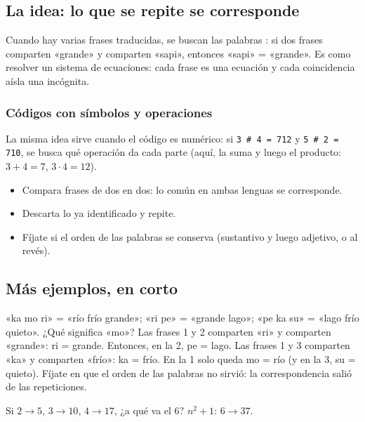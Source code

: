 \bitacora


\subsection{La idea: lo que se repite se corresponde}
Cuando hay varias frases traducidas, se buscan las palabras : si dos frases comparten «grande» y
comparten «sapi», entonces «sapi» = «grande». Es como resolver un sistema de ecuaciones: cada frase es una ecuación y
cada coincidencia aísla una incógnita.

\subsubsection{Códigos con símbolos y operaciones}
La misma idea sirve cuando el código es numérico: si \texttt{3 \# 4 = 712} y \texttt{5 \# 2 = 710}, se busca qué
operación da cada parte (aquí, la suma y luego el producto: $3 + 4 = 7$, $3 \cdot 4 = 12$).

\begin{regla}
\begin{itemize}
  \item Compara frases de dos en dos: lo común en ambas lenguas se corresponde.
  \item Descarta lo ya identificado y repite.
  \item Fíjate si el orden de las palabras se conserva (sustantivo y luego adjetivo, o al revés).
\end{itemize}
\end{regla}

\subsection{Más ejemplos, en corto}
\begin{ejemplo}
«ka mo ri» = «río frío grande»; «ri pe» = «grande lago»; «pe ka su» = «lago frío quieto». ¿Qué significa «mo»?
\solucion Las frases 1 y 2 comparten «ri» y comparten «grande»: ri = grande. Entonces, en la 2, pe = lago. Las frases 1 y
3 comparten «ka» y comparten «frío»: ka = frío. En la 1 solo queda mo = río (y en la 3, su = quieto). Fíjate en que el
orden de las palabras no sirvió: la correspondencia salió de las repeticiones.
\end{ejemplo}

\begin{ejemplo}
Si $2 \to 5$, $3 \to 10$, $4 \to 17$, ¿a qué va el 6?
\solucion $n^2 + 1$: $6 \to 37$.
\end{ejemplo}

